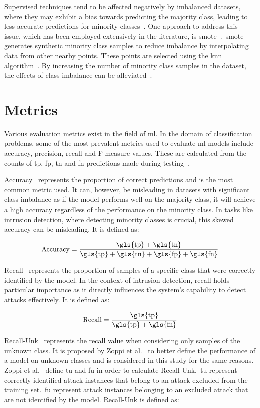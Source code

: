Supervised techniques tend to be affected negatively by imbalanced datasets,
where they may exhibit a bias towards predicting the majority class, leading to
less accurate predictions for minority classes~\cite{imbalance_prob,
    survey_cicids}. One approach to address this issue, which has been employed
extensively in the literature, is \gls{smote}~\cite{smote, smote_survey,
    Karatas, Jiang}.\ \gls{smote} generates synthetic minority class samples to
reduce imbalance by interpolating data from other nearby points. These points
are selected using the \gls{knn} algorithm~\cite{knn}. By increasing the number
of minority class samples in the dataset, the effects of class imbalance can be
alleviated~\cite{smote}.

\section{Metrics}%
\label{sec:metrics}

Various evaluation metrics exist in the field of \gls{ml}. In the domain of
classification problems, some of the most prevalent metrics used to evaluate
\gls{ml} models include accuracy, precision, recall and F-measure values. These
are calculated from the counts of \gls{tp}, \gls{fp}, \gls{tn} and \gls{fn}
predictions made during testing~\cite{metrics}.

Accuracy~\cite{metrics} represents the proportion of correct predictions and is
the most common metric used. It can, however, be misleading in datasets with
significant class imbalance as if the model performs well on the majority
class, it will achieve a high accuracy regardless of the performance on the
minority class. In tasks like intrusion detection, where detecting minority
classes is crucial, this skewed accuracy can be misleading. It is defined as:

\[ \text{Accuracy} = \frac{\text{\gls{tp}}+\text{\gls{tn}}}{\text{\gls{tp}}+\text{\gls{tn}}+\text{\gls{fp}}+\text{\gls{fn}}} \]

Recall~\cite{metrics} represents the proportion of samples of a specific class
that were correctly identified by the model. In the context of intrusion
detection, recall holds particular importance as it directly influences the
system's capability to detect attacks effectively. It is defined as:

\[ \text{Recall} = \frac{\text{\gls{tp}}}{\text{\gls{tp}}+\text{\gls{fn}}} \]

Recall-Unk~\cite{Zoppi} represents the recall value when considering only
samples of the unknown class. It is proposed by Zoppi et al.~\cite{Zoppi} to
better define the performance of a model on unknown classes and is considered
in this study for the same reasons. Zoppi et al.~\cite{Zoppi} define \gls{tu}
and \gls{fu} in order to calculate Recall-Unk.\ \gls{tu} represent correctly
identified attack instances that belong to an attack excluded from the
training set.\ \gls{fu} represent attack instances belonging to an excluded attack
that are not identified by the model. Recall-Unk is defined as:

